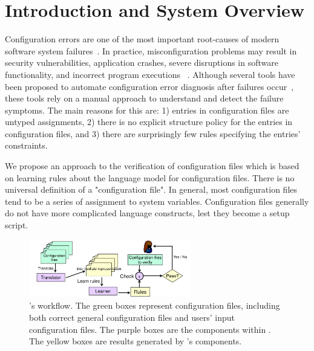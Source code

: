 \section{Introduction and System Overview}
\label{sec:Intro}

Configuration errors are one of the most important root-causes of
modern software system failures~\cite{xu15systems,yin11anempirical}.
In practice, misconfiguration problems may result in security
vulnerabilities, application crashes, severe disruptions in software
functionality, and incorrect program executions%
~\cite{xu15systems,xu13do,zhang14encore,yuan11context}.  Although several
tools have been proposed to automate configuration error diagnosis
after failures occur~\cite{wang04automatic,attariyan10automating,
su07autobash,whitaker04configuration}, these tools rely on a manual approach
  to understand and detect the failure symptoms. The main reasons for this are:
  1) entries in configuration files are untyped assignments, 2) there
  is no explicit structure policy for the entries in configuration
  files, and 3) there are surprisingly few rules specifying the
  entries' constraints.

We propose an approach to the verification of  
configuration files which is based on learning rules about the language 
model for configuration files. 
There is no universal definition of a "configuration file". In general, most configuration files tend to be a series of assignment to system variables. Configuration files generally do not have more complicated language constructs, lest they become a setup script.


\begin{figure}[t] \centering
\includegraphics[width=0.63\textwidth]{figs/overview}
\caption{{\footnotesize \app's workflow. The green boxes represent configuration files,
  including both correct general configuration files and users' input
  configuration files. The purple boxes are the components within \app.
  The yellow boxes are results generated by \app's components.}}
\label{fig-overview}
\end{figure}

